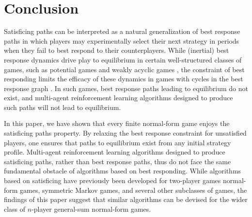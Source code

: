 \section{Conclusion}


Satisficing paths can be interpreted as a natural generalization of best response paths in which players may experimentally select their next strategy in periods when they fail to best respond to their counterplayers. While (inertial) best response dynamics drive play to equilibrium in certain well-structured classes of games, such as potential games and weakly acyclic games \cite{fabrikant2010structure}, the constraint of best responding limits the efficacy of these dynamics in games with cycles in the best response graph \cite{pangallo2019best}. In such games, best response paths leading to equilibrium do not exist, and multi-agent reinforcement learning algorithms designed to produce such paths will not lead to equilibrium. 

In this paper, we have shown that every finite normal-form game enjoys the satisficing paths property. By relaxing the best response constraint for unsatisfied players, one ensures that paths to equilibrium exist from any initial strategy profile. Multi-agent reinforcement learning algorithms designed to produce satisficing paths, rather than best response paths, thus do not face the same fundamental obstacle of algorithms based on best responding. While algorithms based on satisficing have previously been developed for two-player games normal-form games, symmetric Markov games, and several other subclasses of games, the findings of this paper suggest that similar algorithms can be devised for the wider class of $n$-player general-sum normal-form games.
